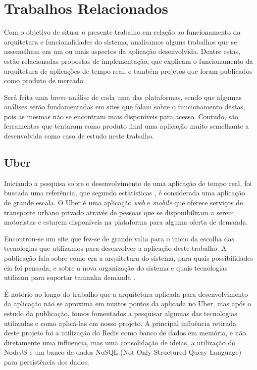 \chapter{Trabalhos Relacionados}
Com o objetivo de situar o presente trabalho em relação ao funcionamento da arquitetura e funcionalidades do sistema, analisamos alguns trabalhos que se assemelham em um ou mais aspectos da aplicação desenvolvida. Dentre estas, estão relacionadas propostas de implementação, que explicam o funcionamento da arquitetura de aplicações de tempo real, e também projetos que foram publicados como produto de mercado.

Será feita uma breve análise de cada uma das plataformas, sendo que algumas análises serão fundamentadas em sites que falam sobre o funcionamento destas, pois as mesmas não se encontram mais disponíveis para acesso. Contudo, são ferramentas que tentaram como produto final uma aplicação muito semelhante a desenvolvida como caso de estudo neste trabalho.

\section{Uber}
Iniciando a pesquisa sobre o desenvolvimento de uma aplicação de tempo real, foi buscada uma referência, que segundo estatísticas \cite{uber-statistics}, é considerada uma aplicação de grande escala. O Uber \cite{uber} é uma aplicação \textit{web} e \textit{mobile} que oferece serviços de transporte urbano privado através de pessoas que se disponibilizam a serem motoristas e estarem disponíveis na plataforma para alguma oferta de demanda.

Encontrou-se um site \cite{uber-how-scales} que fez-se de grande valia para o inicio da escolha das tecnologias que utilizamos para desenvolver a aplicação deste trabalho. A publicação fala sobre como era a arquitetura do sistema, para quais possibilidades ela foi pensada, e sobre a nova organização do sistema e quais tecnologias utilizam para suportar tamanha demanda \cite{uber-statistics}.

É notório ao longo do trabalho que a arquitetura aplicada para desenvolvimento da aplicação não se aproxima em muitos pontos da aplicada no Uber, mas após o estudo da publicação, fomos fomentados a pesquisar algumas das tecnologias utilizadas e como aplicá-las em nosso projeto. A principal influência retirada deste projeto foi a utilização do Redis como banco de dados em memória, e não diretamente uma influencia, mas uma consolidação de ideias, a utilização do NodeJS e um banco de dados NoSQL (Not Only Structured Query Language) \cite{nosql-advantages} para persistência dos dados.

